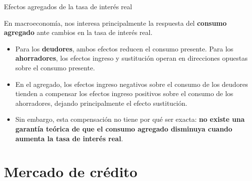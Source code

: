 \documentclass[aspectratio=169,11pt]{beamer}
\begin{document}
\begin{frame}{Efectos agregados de la tasa de interés real}

  En macroeconomía, nos interesa principalmente la respuesta del
  \textbf{consumo agregado} ante cambios en la tasa de interés real.

  \begin{itemize}

    \item Para los \textbf{deudores}, ambos efectos reducen el consumo presente. Para los \textbf{ahorradores}, los efectos ingreso y sustitución operan en direcciones opuestas sobre el consumo presente.

    \item En el agregado, los efectos ingreso negativos sobre el consumo de los deudores tienden a compensar los efectos ingreso positivos sobre el consumo de los ahorradores, dejando principalmente el efecto sustitución.

    \item  Sin embargo, esta compensación no tiene por qué ser exacta: \textbf{no existe una garantía teórica de que el consumo agregado
    disminuya cuando aumenta la tasa de interés real}.

  \end{itemize}

\end{frame}



\section{Mercado de crédito}
\end{document}
